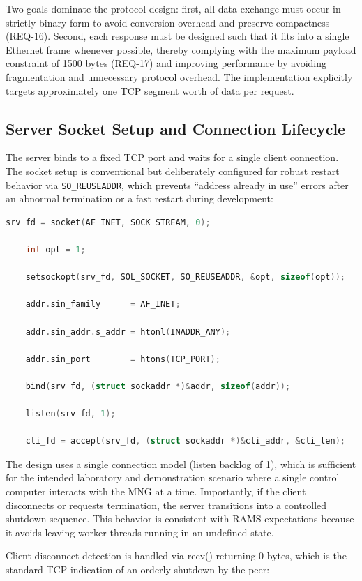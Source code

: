 Two goals dominate the protocol design: first, all data exchange must occur in strictly binary form to avoid conversion overhead and preserve compactness (REQ-16). Second, each response must be designed such that it fits into a single Ethernet frame whenever possible, thereby complying with the maximum payload constraint of 1500 bytes (REQ-17) and improving performance by avoiding fragmentation and unnecessary protocol overhead. The implementation explicitly targets approximately one TCP segment worth of data per request.

\subsection{Server Socket Setup and Connection Lifecycle}

The server binds to a fixed TCP port and waits for a single client connection. The socket setup is conventional but deliberately configured for robust restart behavior via \texttt{SO\_REUSEADDR}, which prevents “address already in use” errors after an abnormal termination or a fast restart during development:

\begin{lstlisting}[language=C]
	srv_fd = socket(AF_INET, SOCK_STREAM, 0);
	
	int opt = 1;
	
	setsockopt(srv_fd, SOL_SOCKET, SO_REUSEADDR, &opt, sizeof(opt));
	
	addr.sin_family      = AF_INET;
	
	addr.sin_addr.s_addr = htonl(INADDR_ANY);
	
	addr.sin_port        = htons(TCP_PORT);
	
	bind(srv_fd, (struct sockaddr *)&addr, sizeof(addr));
	
	listen(srv_fd, 1);
	
	cli_fd = accept(srv_fd, (struct sockaddr *)&cli_addr, &cli_len);
\end{lstlisting}

The design uses a single connection model (listen backlog of 1), which is sufficient for the intended laboratory and demonstration scenario where a single control computer interacts with the MNG at a time. Importantly, if the client disconnects or requests termination, the server transitions into a controlled shutdown sequence. This behavior is consistent with RAMS expectations because it avoids leaving worker threads running in an undefined state.

Client disconnect detection is handled via recv() returning 0 bytes, which is the standard TCP indication of an orderly shutdown by the peer:

